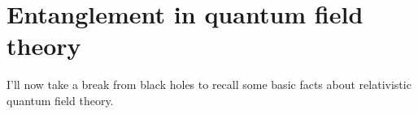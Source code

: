 \documentclass[12pt]{article}
\begin{document}


\section{Entanglement in quantum field theory}\label{qftentsec}
I'll now take a break from black holes to recall some basic facts about relativistic quantum field theory.
\end{document}
